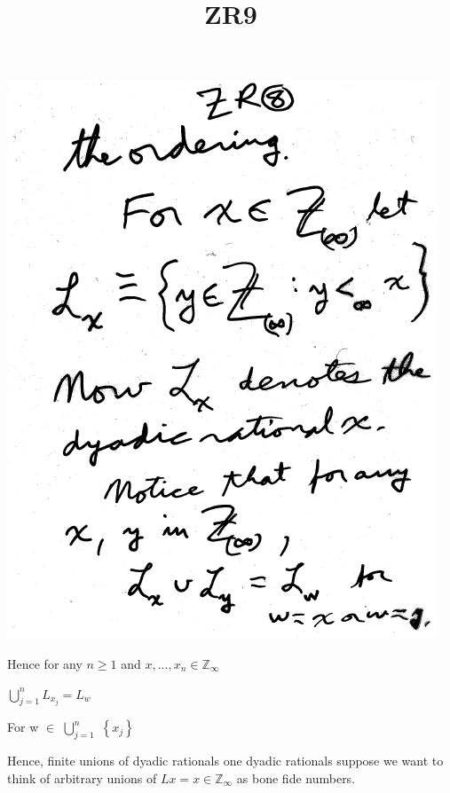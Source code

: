 \documentclass[10pt,a4paper]{article}
\begin{document}
{{\includegraphics[scale=0.6]{pages/ZR8.png}

\newpage

\title{ZR9} 

\maketitle

Hence for any $n\geqslant1$ and $x,..., x_{n} \in \mathbb{Z}_{\infty}$
  


    $\bigcup_{j=1}^{n} L_{x_j} = L_{w}$ 
   
                          
               
      
       For w $\in$ $\bigcup_{j=1}^{n}$ $\left\{x_{j}\right\}$
                         
                          
               
Hence, finite unions of dyadic rationals one dyadic rationals suppose we want to think of arbitrary unions of 
$L{x}= x\in\mathbb{Z}_{\infty}$ as bone fide numbers. 

}}
\end{document}
